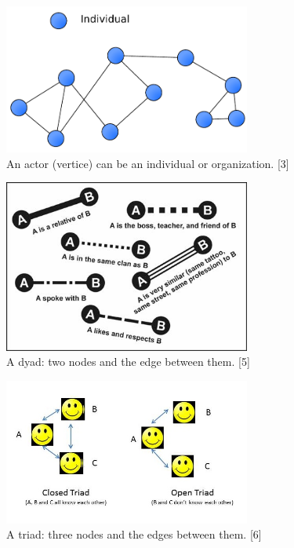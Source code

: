 \documentclass[conference,letterpaper]{IEEEtran}
\begin{document}
\begin{center}
\begin{figure}[hb]
\centering
\includegraphics[width=3.2in]{social-network}
\caption{
An actor (vertice) can be an individual or organization. [3]
}
\label{fig_sim}
\end{figure}
\end{center}

\begin{center}
\begin{figure}[hb]
\centering
\includegraphics[width=3.2in]{f03}
\caption{
A dyad: two nodes and the edge between them. [5]
}
\label{fig_sim}
\end{figure}
\end{center}

\begin{center}
\begin{figure}[hb]
\centering
\includegraphics[width=3.2in]{open-triad}
\caption{
A triad: three nodes and the edges between them. [6]
}
\label{fig_sim}
\end{figure}
\end{center}
\end{document}
